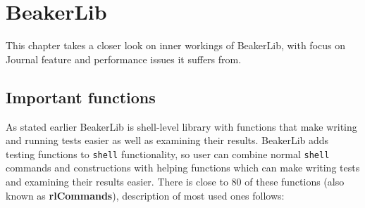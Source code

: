 \chapter{BeakerLib}
\label{beakerlib_chapter}

This chapter takes a closer look on inner workings of BeakerLib, with focus on Journal feature and performance issues it suffers from. 

\section{Important functions}
As stated earlier BeakerLib is shell-level library with functions that make writing and running tests easier as well as examining their results.
BeakerLib adds testing functions to \texttt{shell} functionality, so user can combine normal \texttt{shell} commands and constructions with helping functions which can make writing tests and examining their results easier. There is close to 80 of these functions (also known as \textbf{rlCommands}), description of most used ones follows:
